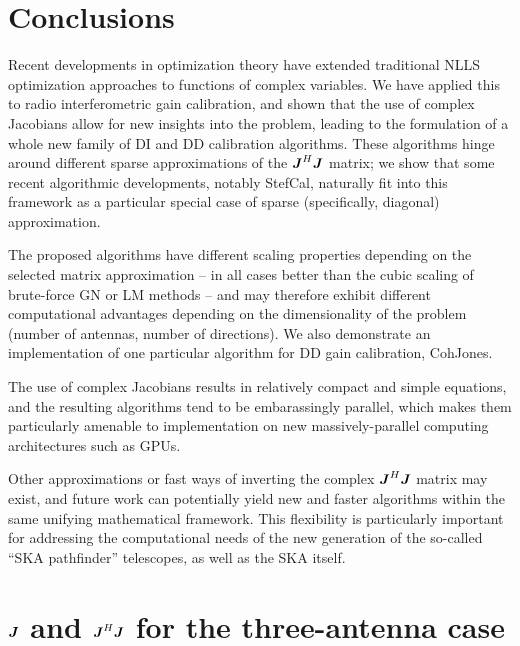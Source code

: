 \documentclass[useAMS,usenatbib]{mn2e}
\newcommand{\mat}[1]{{\bmath{#1}}}
\newcommand{\JJ}{\mat{J}} %
\newcommand{\JHJ}{\JJ^H\JJ} %
\newcommand{\COH}{{\sc CohJones}}
\newcommand{\StefCal}{{\sc StefCal}}
\begin{document}

\section*{Conclusions}

Recent developments in optimization theory have extended traditional NLLS optimization approaches
to functions of complex variables. We have applied this to radio interferometric gain calibration, 
and shown that the use of complex Jacobians allow for new insights into the problem, leading
to the formulation of a whole new family of DI and DD calibration algorithms. These algorithms hinge around
different sparse approximations of the $\JHJ$ matrix; we show that some recent algorithmic 
developments, notably \StefCal, naturally fit into this framework as a particular special case
of sparse (specifically, diagonal) approximation. 

The proposed algorithms have different scaling properties depending on the selected matrix approximation
-- in all cases better than the cubic scaling of brute-force GN or LM methods -- and may therefore exhibit 
different computational advantages depending on the dimensionality of the problem (number of antennas,
number of directions). We also demonstrate an implementation of one particular algorithm for DD gain
calibration, \COH.

The use of complex Jacobians results in relatively compact and simple equations, and the resulting algorithms
tend to be embarassingly parallel, which makes them particularly amenable to implementation on new
massively-parallel computing architectures such as GPUs. 

Other approximations or fast ways of inverting the complex $\JHJ$ matrix may exist, and future work can 
potentially yield new and faster algorithms within the same unifying mathematical framework. This flexibility 
is particularly important for addressing the computational needs of the new generation of the 
so-called ``SKA pathfinder'' telescopes, as well as the SKA itself.






\appendix

\section{$\JJ$ and $\JJ^H\JJ$ for the three-antenna case}
\label{sec:3ant}
\end{document}
